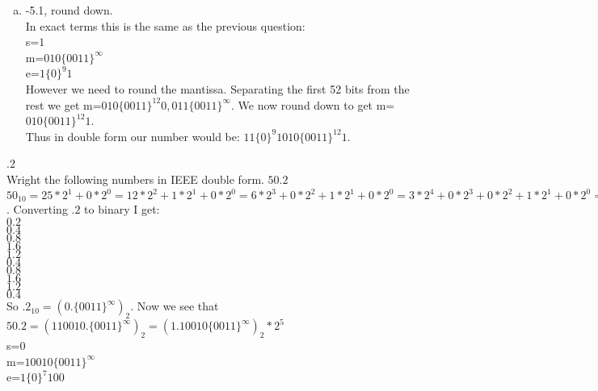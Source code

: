 \documentclass[12pt]{article}
\makeatletter
\theoremstyle{homework}
\newenvironment{exercise}[1]
{\def\@currentlabel{#1}\exercisecore}
{\endexercisecore}
\makeatother
\begin{document}
\begin{enumerate}[(a)]
In exact terms this is the negation of the previous question:\\
s=$1$\\
m=$010\{0011\}^\infty$\\
e=$1\{0\}^9 1$\\
However we need to round the mantissa.  Separating the first 52 bits from the rest we get m=$010\{0011\}^{12}0,011\{0011\}^\infty$.  We now round to 0 to get m=$010\{0011\}^{12}0$.\\
Thus in double form our number would be: $11\{0\}^9 1010\{0011\}^{12}0$.
\item
-5.1, round down.\\
In exact terms this is the same as the previous question:\\
s=$1$\\
m=$010\{0011\}^\infty$\\
e=$1\{0\}^9 1$\\
However we need to round the mantissa.  Separating the first 52 bits from the rest we get m=$010\{0011\}^{12}0,011\{0011\}^\infty$.  We now round down to get m=$010\{0011\}^{12}1$.\\
Thus in double form our number would be: $11\{0\}^9 1010\{0011\}^{12}1$.

\end{enumerate}
\begin{exercise}

5.2\\
Wright the following numbers in IEEE double form. $50.2$
\end{exercise}
$50_{10}=25*2^1+0*2^0=12*2^2+1*2^1+0*2^0=6*2^3+0*2^2+1*2^1+0*2^0=
3*2^4+0*2^3+0*2^2+1*2^1+0*2^0=1*2^5+1*2^4+0*2^3+0*2^2+1*2^1+0*2^0=110010_2$.  Converting $.2$ to binary I get:\\
$0.2$\\
$0.4$\\
$0.8$\\
$1.6$\\
$1.2$\\
$0.4$\\
$0.8$\\
$1.6$\\
$1.2$\\
$0.4$\\
So $.2_{10}=(0.\{0011\}^\infty)_2$.  Now we see that $50.2=(110010.\{0011\}^\infty)_2=(1.10010\{0011\}^\infty)_2*2^5$\\
s=$0$\\
m=$10010\{0011\}^\infty$\\
e=$1\{0\}^7 100$\\
\end{document}
